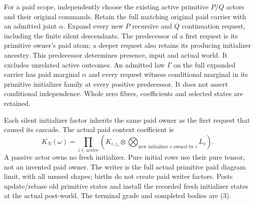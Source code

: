 \documentclass[11pt]{article}
\begin{document}
For a paid scope, independently choose the existing active primitive $P/Q$ actors and their original commands. Retain the full matching original paid carrier with an admitted joint $\alpha$. Expand every new $P$ recursive and $Q$ continuation request, including the finite silent descendants. The predecessor of a first request is its primitive owner's paid atom; a deeper request also retains its producing initializer ancestry. This predecessor determines presence, input and actual world. It excludes unrelated active outcomes. An admitted law $\Gamma$ on the full expanded carrier has paid marginal $\alpha$ and every request witness conditional marginal in its primitive initializer family at every positive predecessor. It does not assert conditional independence. Whole zero fibres, coefficients and selected states are retained.

Each silent initializer factor inherits the same paid owner as the first request that caused its cascade. The actual paid context coefficient is
\[
 K_N(\omega)=\prod_{i\in\mathrm{active}}
       \left(K_{i,z_i}\otimes
               \bigotimes_{\text{new initializer }v\text{ owned by }i}L_v\right). \tag{4}
\]
A passive actor owns no fresh initializer. Pure initial rows use their pure tensor, not an invented paid owner. The writer is the full actual primitive paid diagram limit, with all unused shapes; births do not create paid writer factors. Posts update/rebase old primitive states and install the recorded fresh initializer states at the actual post-world. The terminal grade and completed bodies are (3).
\end{document}
